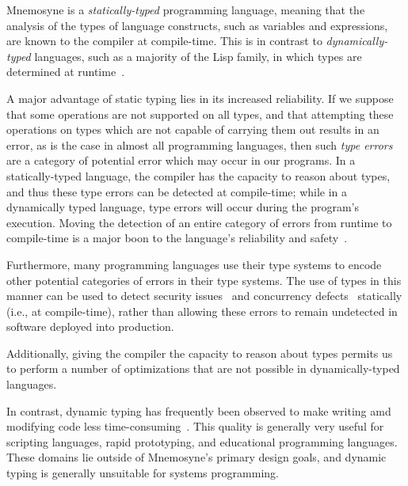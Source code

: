 Mnemosyne is a \textit{statically-typed} programming language, meaning that the analysis of the types of language constructs, such as variables and expressions, are known to the compiler at compile-time. This is in contrast to \textit{dynamically-typed} languages, such as a majority of the Lisp family, in which types are determined at runtime~\cite{Mitchell:2003:TT:1074100.1074885}.

A major advantage of static typing lies in its increased reliability. If we suppose that some operations are not supported on all types, and that attempting these operations on types which are not capable of carrying them out results in an error, as is the case in almost all programming languages, then such \textit{type errors} are a category of potential error which may occur in our programs. In a statically-typed language, the compiler has the capacity to reason about types, and thus these type errors can be detected at compile-time; while in a dynamically typed language, type errors will occur during the program's execution. Moving the detection of an entire category of errors from runtime to compile-time is a major boon to the language's reliability and safety~\cite{Mitchell:2003:TT:1074100.1074885,Mayer:2012:ESI:2398857.2384666}.

Furthermore, many programming languages use their type systems to encode other potential categories of errors in their type systems. The use of types in this manner can be used to detect security issues~\cite{Skalka:2000:SES:357766.351244} and concurrency defects~\cite{Sagonas:2010:USA:2175429.2175432} statically (i.e., at compile-time), rather than allowing these errors to remain undetected in software deployed into production.

Additionally, giving the compiler the capacity to reason about types permits us to perform a number of optimizations that are not possible in dynamically-typed languages.

In contrast, dynamic typing has frequently been observed to make writing amd modifying code less time-consuming~\cite{Mayer:2012:ESI:2398857.2384666,}. This quality is generally very useful for scripting languages, rapid prototyping, and educational programming languages. These domains lie outside of Mnemosyne's primary design goals, and dynamic typing is generally unsuitable for systems programming.

